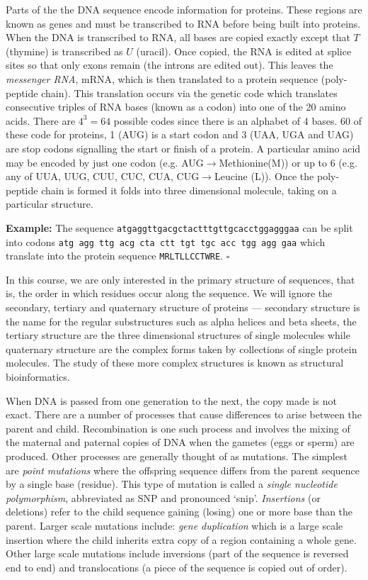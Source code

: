 \documentclass[11pt]{article}
\newcommand{\sqend}{\hfill $\square$}
\begin{document}
Parts of the the DNA sequence encode information for proteins.  These regions are known as genes and must be transcribed to RNA before being built into proteins.  When the DNA is transcribed to RNA, all bases are copied exactly except that $T$ (thymine) is transcribed as $U$ (uracil).  Once copied, the RNA is edited at splice sites so that only exons remain (the introns are edited out).  This leaves the {\em messenger RNA}, mRNA, which is then  translated to a protein sequence (poly-peptide chain).  This translation  occurs via the genetic code which translates consecutive triples of RNA bases (known as a codon) into one of the 20 amino acids.  There are $4^3 = 64$ possible codes since there is an alphabet of 4 bases.  60 of these code for proteins, 1 (AUG) is a start codon and 3 (UAA, UGA and UAG) are stop codons signalling the start or finish of a protein.  A particular  amino acid may be encoded by just one codon (e.g. AUG$\rightarrow$Methionine(M)) or up to 6 (e.g. any of  UUA, UUG, CUU, CUC, CUA, CUG$\rightarrow$Leucine (L)).    Once the poly-peptide chain is formed it folds into three dimensional molecule, taking on a particular structure.

{\bf Example:} The sequence {\tt atgaggttgacgctactttgttgcacctggagggaa} can be split into codons {\tt atg agg ttg acg cta ctt tgt tgc acc tgg agg gaa} which translate into the protein sequence {\tt MRLTLLCCTWRE}. \sqend

In this course, we are only interested in the primary structure of sequences, that is, the order in which residues occur along the sequence.  We will ignore the secondary, tertiary and quaternary structure of proteins ---  secondary structure is the name for  the regular substructures such as alpha helices and beta sheets, the tertiary structure are the three dimensional structures of single molecules while quaternary structure are the complex forms taken by collections of single protein molecules.  The study of these more complex structures is known as structural bioinformatics.

When DNA is passed from one generation to the next, the copy made is not exact.    There are a number of processes that cause differences to arise between the parent and child.  Recombination is one such process and involves the mixing of the maternal and paternal copies of DNA when the gametes (eggs or sperm) are produced.  Other processes are generally thought of as mutations.  The simplest are {\em point mutations} where the offspring sequence differs from the parent sequence by a single base (residue).  This type of mutation is called a {\em single nucleotide polymorphism}, abbreviated as SNP and pronounced `snip'.   {\em Insertions} (or deletions) refer to the child sequence gaining (losing) one or more base than the parent.  Larger scale mutations include: {\em gene duplication} which is a large scale  insertion where the child inherits  extra copy of a region containing a whole gene.  Other large scale  mutations include inversions (part of the sequence is reversed end to end) and translocations (a piece of the sequence is copied out of order).
\end{document}
